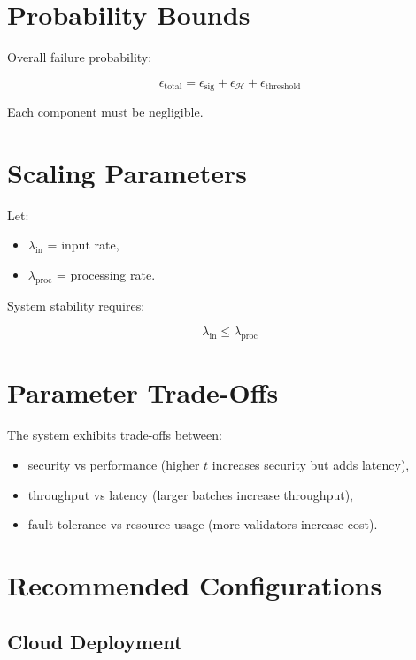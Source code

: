 \section{Probability Bounds}

Overall failure probability:

\begin{equation}
\epsilon_{\text{total}} = \epsilon_{\text{sig}} + \epsilon_{\mathcal{H}} + \epsilon_{\text{threshold}}
\end{equation}

Each component must be negligible.

\section{Scaling Parameters}

Let:

\begin{itemize}
\item $\lambda_{\text{in}}$ = input rate,
\item $\lambda_{\text{proc}}$ = processing rate.
\end{itemize}

System stability requires:

\begin{equation}
\lambda_{\text{in}} \leq \lambda_{\text{proc}}
\end{equation}

\section{Parameter Trade-Offs}

The system exhibits trade-offs between:

\begin{itemize}
\item security vs performance (higher $t$ increases security but adds latency),
\item throughput vs latency (larger batches increase throughput),
\item fault tolerance vs resource usage (more validators increase cost).
\end{itemize}

\section{Recommended Configurations}

\subsection{Cloud Deployment}

